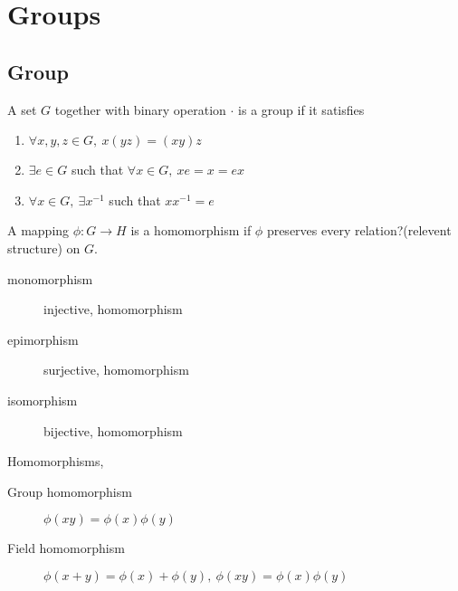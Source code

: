 \chapter{Groups}
\section{Group}
	\begin{definition}
		A set $G$ together with binary operation $\cdot$ is a group if it satisfies
		\begin{enumerate}
			\item $\forall x,y,z \in G,\ x(yz) = (xy)z$
			\item $\exists e \in G$ such that $\forall x \in G,\ xe = x = ex$
			\item $\forall x \in G,\ \exists x^{-1}$ such that $xx^{-1} = e$
		\end{enumerate}
	\end{definition}
	\begin{definition}
		A mapping $\phi : G \to H$ is a homomorphism if $\phi$ preserves every relation?(relevent structure) on $G$.
		\begin{description}
			\item[monomorphism] injective, homomorphism
			\item[epimorphism] surjective, homomorphism
			\item[isomorphism] bijective, homomorphism
		\end{description}
	\end{definition}
	\begin{definition} Homomorphisms,
		\begin{description}
			\item[Group homomorphism] $\phi (xy) = \phi(x) \phi(y)$
			\item[Field homomorphism] $\phi (x+y) = \phi(x) + \phi(y),\ \phi(xy) = \phi(x)\phi(y)$
		\end{description}
	\end{definition}

